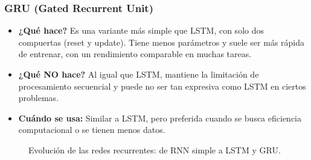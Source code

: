 \documentclass[12pt,a4paper,openany,oneside]{book}
\begin{document}
\subsubsection{GRU (Gated Recurrent Unit)}
\begin{itemize}
\item \textbf{¿Qué hace?} Es una variante más simple que LSTM, con solo dos compuertas (reset y update). Tiene menos parámetros y suele ser más rápida de entrenar, con un rendimiento comparable en muchas tareas.
\item \textbf{¿Qué NO hace?} Al igual que LSTM, mantiene la limitación de procesamiento secuencial y puede no ser tan expresiva como LSTM en ciertos problemas.
\item \textbf{Cuándo se usa:} Similar a LSTM, pero preferida cuando se busca eficiencia computacional o se tienen menos datos.
\end{itemize}

\begin{figure}[h]
\centering
{}
\caption{Evolución de las redes recurrentes: de RNN simple a LSTM y GRU.}
\end{figure}
\end{document}

